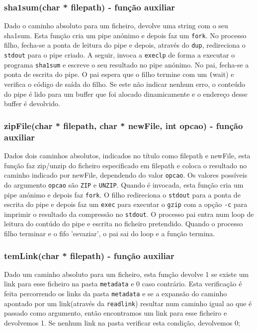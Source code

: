 \subsubsection{ sha1sum(char * filepath) - função auxiliar}
Dado o caminho absoluto para um ficheiro, devolve uma string com o seu sha1sum. Esta função cria um pipe anónimo e depois faz um \texttt{fork}. No processo filho,
fecha-se a ponta de leitura do pipe e depois, através do \texttt{dup}, redireciona o \texttt{stdout} para o pipe criado. A seguir, invoca a \texttt{execlp} 
de forma a executar o programa \texttt{sha1sum} e escreve o seu resultado no pipe anónimo. No pai, fecha-se a ponta de escrita do pipe.
O pai espera que o filho termine com um \texttt(wait) e verifica 
o código de saída do filho. Se este não indicar nenhum erro, o conteúdo do pipe é lido para um buffer que foi alocado dinamicamente e o endereço desse buffer
é devolvido.
\subsubsection{ zipFile(char * filepath, char * newFile, int opcao) - função auxiliar}
Dados dois caminhos absolutos, indicados no título como filepath e newFile, esta função faz zip/unzip do ficheiro especificado em filepath e coloca o resultado
no caminho indicado por newFile, dependendo do valor \texttt{opcao}. Os valores possíveis do argumento \texttt{opcao} são \texttt{ZIP} e \texttt{UNZIP}.
Quando é invocada, esta função cria um pipe anónimo e depois faz \texttt{fork}. O filho redireciona o \texttt{stdout} para a ponta de escrita do pipe e depois faz
um \texttt{exec} para executar o \texttt{gzip} com a opção \texttt{-c} para imprimir o resultado da compressão no \texttt{stdout}. O processo pai entra num loop
de leitura do contúdo do pipe e escrita no ficheiro pretendido. Quando o processo filho terminar e o fifo 'esvaziar', o pai sai do loop e a função termina.

\subsubsection{ temLink(char * filepath) - função auxiliar}
Dado um caminho absoluto para um ficheiro, esta função devolve 1 se existe um link para esse ficheiro na pasta \texttt{metadata} e 0 caso contrário.
Esta verificação é feita percorrendo os links da pasta \texttt{metadata} e se a expansão do caminho apontado por um link(através da \texttt{readlink}) 
resultar num caminho igual ao que é passado como argumento, então encontramos um link para esse ficheiro e devolvemos 1. Se nenhum link na pasta verificar 
esta condição, devolvemos 0;

